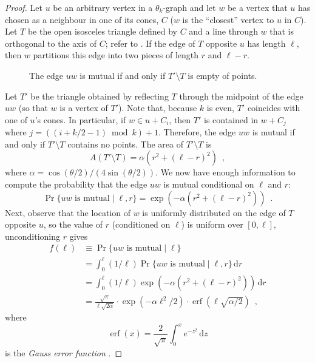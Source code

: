 \documentclass{patmorin}
\DeclareMathOperator{\erf}{erf}
\begin{document}
\begin{proof}
  Let $u$ be an arbitrary vertex in a $\theta_k$-graph and let $w$
  be a vertex that $u$ has chosen as a neighbour in one of its cones,
  $C$ ($w$ is the ``closest'' vertex to $u$ in $C$).  Let $T$ be the
  open isosceles triangle defined by $C$ and a line through $w$ that is
  orthogonal to the axis of $C$; refer to .  If the edge
  of $T$ opposite $u$ has length $\ell$, then $w$ partitions this edge
  into two pieces of length $r$ and $\ell-r$.

  \begin{figure}
    \caption{The edge $uw$ is mutual if and only if $T'\setminus T$ 
       is empty of points.}
  \end{figure}
 
  Let $T'$ be the triangle obtained by reflecting $T$ through the
  midpoint of the edge $uw$ (so that $w$ is a vertex of $T'$). Note
  that, because $k$ is even, $T'$ coincides with one of $u$'s cones.
  In particular, if $w\in u+C_i$, then $T'$ is contained in $w+C_{j}$
  where $j=((i+k/2-1)\bmod k)+1$.  Therefore, the edge $uw$ is mutual if and
  only if $T'\setminus T$ contains no points.  The area of $T'\setminus
  T$ is
  \[
     A(T'\setminus T) = \alpha(r^2+(\ell-r)^2)  \enspace ,
  \]
  where $\alpha=\cos(\theta/2)/(4\sin(\theta/2))$.  We now have
  enough information to compute the probability that the edge $uw$
  is mutual conditional on $\ell$ and $r$:
  \[
    \Pr\{\mbox{$uw$ is mutual} \mid \ell,r\} = \exp(-\alpha(r^2+(\ell-r)^2))
      \enspace .
  \]
  Next, observe that the location of $w$ is uniformly distributed on the
  edge of $T$ opposite $u$, so the value of $r$ (conditioned on $\ell$)
  is uniform over $[0,\ell]$, unconditioning $r$ gives
  \begin{align*}
    f(\ell) & \equiv \Pr\{\mbox{$uw$ is mutual} \mid \ell\} \\
     & = \int_0^\ell 
          (1/\ell)\Pr\{\mbox{$uw$ is mutual} \mid \ell,r\}\,\mathrm{d}r \\
     & = \int_0^\ell (1/\ell)\exp(-\alpha(r^2+(\ell-r)^2))\,\mathrm{d}r \\
     & = \frac{\sqrt{\pi}}{\ell\sqrt{2\alpha}}
            \cdot\exp(-\alpha\ell^2/2)
            \cdot\erf(\ell\sqrt{\alpha/2})  \enspace ,
  \end{align*}
  where 
  \[ \erf(x)=\frac{2}{\sqrt{\pi}}\int_0^x e^{-z^2}\,\mathrm{d}z \]
  is the \emph{Gauss error function}
  \cite[Section~7.2]{abramowitz.stegun:handbook}.


\end{proof}
\end{document}
